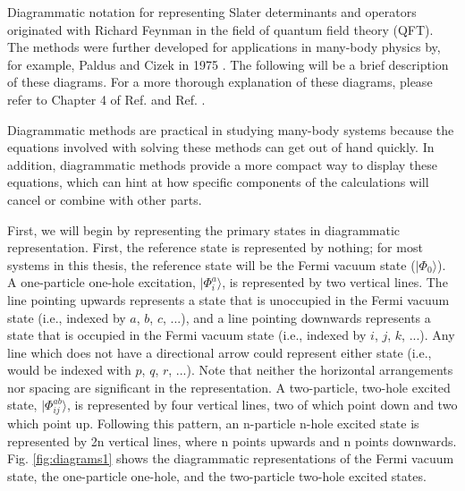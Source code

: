 Diagrammatic notation for representing Slater determinants and operators originated with Richard Feynman in the field of quantum field theory (QFT). The methods were further developed for applications in many-body physics by, for example, Paldus and Cizek in 1975 \cite{Ref160}. The following will be a brief description of these diagrams. For a more thorough explanation of these diagrams, please refer to Chapter 4 of Ref. \cite{Ref21} and Ref. \cite{Ref160}.  

Diagrammatic methods are practical in studying many-body systems because the equations involved with solving these methods can get out of hand quickly. In addition, diagrammatic methods provide a more compact way to display these equations, which can hint at how specific components of the calculations will cancel or combine with other parts.


First, we will begin by representing the primary states in diagrammatic representation. First, the reference state is represented by nothing; for most systems in this thesis, the reference state will be the Fermi vacuum state ($|\Phi_0\rangle$). A one-particle one-hole excitation, $|\Phi^a_i \rangle$, is represented by two vertical lines. The line pointing upwards represents a state that is unoccupied in the Fermi vacuum state (i.e., indexed by $a$, $b$, $c$, ...), and a line pointing downwards represents a state that is occupied in the Fermi vacuum state (i.e., indexed by $i$, $j$, $k$, ...). Any line which does not have a directional arrow could represent either state (i.e., would be indexed with $p$, $q$, $r$, ...). Note that neither the horizontal arrangements nor spacing are significant in the representation. A two-particle, two-hole excited state, $| \Phi_{ij}^{ab} \rangle$, is represented by four vertical lines, two of which point down and two which point up. Following this pattern, an n-particle n-hole excited state is represented by 2n vertical lines, where n points upwards and n points downwards. Fig. \ref{fig:diagrams1} shows the diagrammatic representations of the Fermi vacuum state, the one-particle one-hole, and the two-particle two-hole excited states.

